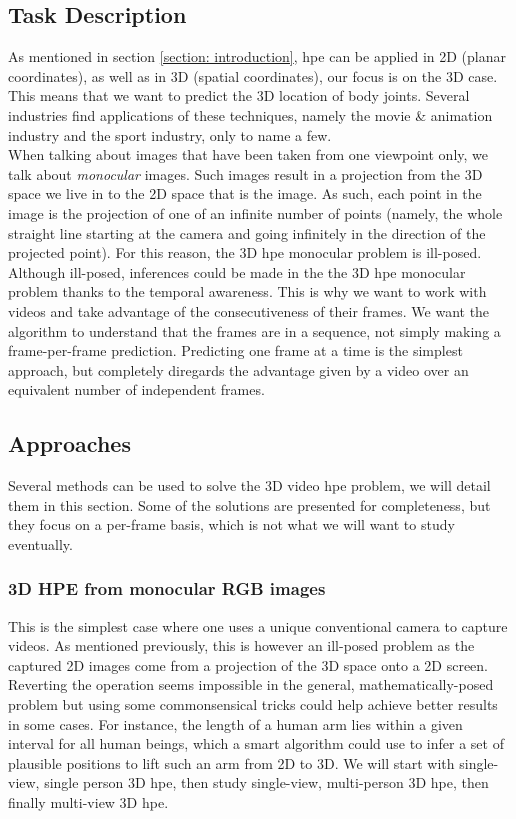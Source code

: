 \documentclass[runningheads]{llncs}
\begin{document}
\subsection{Task Description}
As mentioned in section \ref{section: introduction}, \ac{hpe} can be applied in 2D (planar coordinates), as well as in 3D (spatial coordinates), our focus is on the 3D case. This means that we want to predict the 3D location of body joints. Several industries find applications of these techniques, namely the movie \& animation industry and the sport industry, only to name a few. \\
When talking about images that have been taken from one viewpoint only, we talk about \textit{monocular} images. Such images result in a projection from the 3D space we live in to the 2D space that is the image. As such, each point in the image is the projection of one of an infinite number of points (namely, the whole straight line starting at the camera and going infinitely in the direction of the projected point). For this reason, the 3D \ac{hpe} monocular problem is ill-posed. \\
Although ill-posed, inferences could be made in the the 3D \ac{hpe} monocular problem thanks to the temporal awareness. This is why we want to work with videos and take advantage of the consecutiveness of their frames. We want the algorithm to understand that the frames are in a sequence, not simply making a frame-per-frame prediction. Predicting one frame at a time is the simplest approach, but completely diregards the advantage given by a video over an equivalent number of independent frames.

\subsection{Approaches}
Several methods can be used to solve the 3D video \ac{hpe} problem, we will detail them in this section. Some of the solutions are presented for completeness, but they focus on a per-frame basis, which is not what we will want to study eventually.

\subsubsection{3D HPE from monocular RGB images}
This is the simplest case where one uses a unique conventional camera to capture videos. As mentioned previously, this is however an ill-posed problem as the captured 2D images come from a projection of the 3D space onto a 2D screen. Reverting the operation seems impossible in the general, mathematically-posed problem but using some commonsensical tricks could help achieve better results in some cases. For instance, the length of a human arm lies within a given interval for all human beings, which a smart algorithm could use to infer a set of plausible positions to lift such an arm from 2D to 3D. We will start with single-view, single person 3D \ac{hpe}, then study single-view, multi-person 3D \ac{hpe}, then finally multi-view 3D \ac{hpe}.
\end{document}
